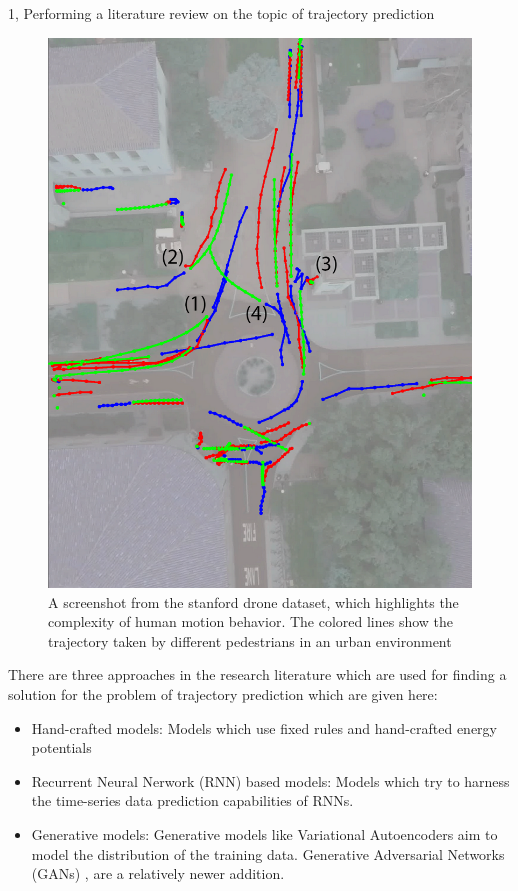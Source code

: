 \documentclass[10pt,a4paper]{article}
\begin{document}
\begin{task}{1, Performing a literature review on the topic of trajectory prediction}
    \begin{figure}[H]
    \centering
    \includegraphics[scale=0.175]{pictures/example_trajectory.png}
    \caption{A screenshot from the stanford drone dataset, which highlights the complexity of human motion behavior. The colored lines show the trajectory taken by different pedestrians in an urban environment}
    \label{fig:example_trajectory}
    \end{figure}
    
    There are three approaches in the research literature which are used for finding a solution for the problem of trajectory prediction which are given here:
    
    \begin{itemize}
        \item Hand-crafted models: Models which use fixed rules and hand-crafted energy potentials \cite{laura}
        \item Recurrent Neural Nerwork (RNN) based models: Models which try to harness the time-series data prediction capabilities of RNNs.
        \item Generative models: Generative models like Variational Autoencoders \cite{vae} aim to model the distribution of the training data. Generative Adversarial Networks (GANs) \cite{gan}, are a relatively newer addition.
    \end{itemize}
    

\end{task}
\end{document}
